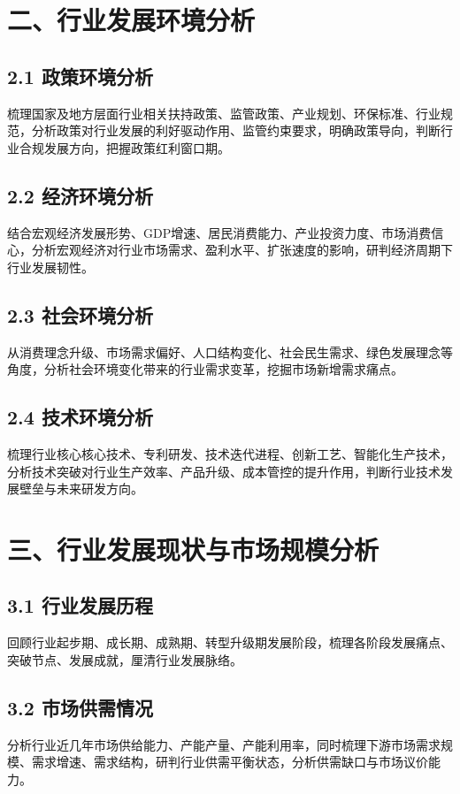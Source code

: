 \documentclass[12pt,a4paper,UTF8]{ctexart}
\begin{document}
\section{二、行业发展环境分析}
\subsection{2.1 政策环境分析}
梳理国家及地方层面行业相关扶持政策、监管政策、产业规划、环保标准、行业规范，分析政策对行业发展的利好驱动作用、监管约束要求，明确政策导向，判断行业合规发展方向，把握政策红利窗口期。

\subsection{2.2 经济环境分析}
结合宏观经济发展形势、GDP增速、居民消费能力、产业投资力度、市场消费信心，分析宏观经济对行业市场需求、盈利水平、扩张速度的影响，研判经济周期下行业发展韧性。

\subsection{2.3 社会环境分析}
从消费理念升级、市场需求偏好、人口结构变化、社会民生需求、绿色发展理念等角度，分析社会环境变化带来的行业需求变革，挖掘市场新增需求痛点。

\subsection{2.4 技术环境分析}
梳理行业核心核心技术、专利研发、技术迭代进程、创新工艺、智能化生产技术，分析技术突破对行业生产效率、产品升级、成本管控的提升作用，判断行业技术发展壁垒与未来研发方向。

\section{三、行业发展现状与市场规模分析}
\subsection{3.1 行业发展历程}
回顾行业起步期、成长期、成熟期、转型升级期发展阶段，梳理各阶段发展痛点、突破节点、发展成就，厘清行业发展脉络。

\subsection{3.2 市场供需情况}
分析行业近几年市场供给能力、产能产量、产能利用率，同时梳理下游市场需求规模、需求增速、需求结构，研判行业供需平衡状态，分析供需缺口与市场议价能力。
\end{document}
